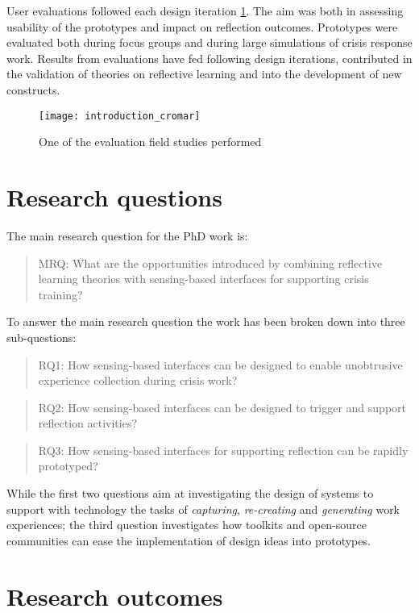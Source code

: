 User evaluations followed each design iteration \ref{fig:cromar}. The aim was both in assessing usability of the prototypes and impact on reflection outcomes. Prototypes were evaluated both during focus groups and during large simulations of crisis response work. Results from evaluations have fed following design iterations, contributed in the validation of theories on reflective learning and into the development of new constructs.
\begin{figure}
	[tbh] \centering 
	\texttt{[image: introduction\_cromar]} \caption{One of the evaluation field studies performed} \label{fig:cromar} 
\end{figure}

\section{Research questions}\label{research-questions}

The main research question for the PhD work is:
\begin{quote}
	MRQ: What are the opportunities introduced by combining reflective learning theories with sensing-based interfaces for supporting crisis training? 
\end{quote}

To answer the main research question the work has been broken down into three sub-questions:
\begin{quote}
	RQ1: How sensing-based interfaces can be designed to enable unobtrusive experience collection during crisis work? 
\end{quote}
\begin{quote}
	RQ2: How sensing-based interfaces can be designed to trigger and support reflection activities? 
\end{quote}
\begin{quote}
	RQ3: How sensing-based interfaces for supporting reflection can be rapidly prototyped? 
\end{quote}

While the first two questions aim at investigating the design of systems to support with technology the tasks of \emph{capturing}, \emph{re-creating} and \emph{generating} work experiences; the third question investigates how toolkits and open-source communities can ease the implementation of design ideas into prototypes.

\section{Research outcomes}\label{research-outcomes}

